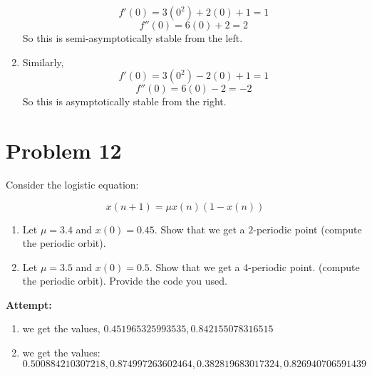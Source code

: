 \documentclass[12pt,letterpaper]{article}
\theoremstyle{definition}
\begin{document}
\begin{changemargin}{.5cm}{0cm}
\begin{enumerate}[label=(\roman*)]
    \begin{equation*}
        f'(0) = 3(0^2) + 2(0) +1 = 1
    \end{equation*}
    \begin{equation*}
        f''(0) = 6(0) + 2 = 2
    \end{equation*}
    So this is semi-asymptotically stable from the left.
    

  \item  Similarly,
      \begin{equation*}
        f'(0) = 3(0^2) - 2(0) +1 = 1
    \end{equation*}
    \begin{equation*}
        f''(0) = 6(0) - 2 = -2
    \end{equation*}
    So this is asymptotically stable from the right.

\end{enumerate}

\end{changemargin}

\newpage

\section*{Problem 12}
Consider the logistic equation:

\begin{equation*}
    x(n+1) = \mu x(n) (1-x(n))
\end{equation*}

\begin{enumerate}[label=(\roman*)]
    \item Let $\mu = 3.4$ and $x(0) = 0.45$. Show that we get a $2$-periodic point (compute the periodic orbit).
    \item Let $\mu=3.5$ and $x(0) =0.5$. Show that we get a 4-periodic point. (compute the periodic orbit). Provide the code you used.
\end{enumerate}

\textbf{Attempt:}
\begin{changemargin}{.5cm}{0cm}

\begin{enumerate}
    \item we get the values, $0.451965325993535,   0.842155078316515$
    
    \item we get the values:
    \begin{equation*}
        0.500884210307218 ,  0.874997263602464  , 0.382819683017324  , 0.826940706591439
    \end{equation*}
    
\end{enumerate}

\end{changemargin}
\newpage
\end{document}
